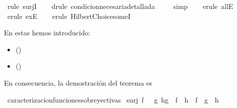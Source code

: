 \begin{isabellebody}
\isamarkupfalse%
\ {\isacharparenleft}rule\ surjI{\isacharparenright}\isanewline
\ \ \isamarkupfalse%
\ {\isacharparenleft}drule\ condicion{\isacharunderscore}necesaria{\isacharunderscore}detallada{\isacharparenright}\isanewline
\ \ \ \isamarkupfalse%
\ simp\isanewline
\ \ \isamarkupfalse%
\ {\isacharparenleft}erule\ allE{\isacharparenright}\isanewline
\ \ \isamarkupfalse%
\ {\isacharparenleft}erule\ exE{\isacharparenright}{\isacharplus}\isanewline
\ \ \isamarkupfalse%
\ {\isacharparenleft}erule\ Hilbert{\isacharunderscore}Choice{\isachardot}someI{\isacharparenright}\isanewline
\ \ \isamarkupfalse%
%
\endisatagproof
{\isafoldproof}%
%
\isadelimproof
%
\endisadelimproof
%
\begin{isamarkuptext}%
En estas hemos introducido:
 \begin{itemize}
    \item[]  
      \hfill ()
     \item[]  
      \hfill ()
\end{itemize}%
\end{isamarkuptext}\isamarkuptrue%
%
\isadelimdocument
%
\endisadelimdocument
%
\isatagdocument
%
\isamarkuptrue%
%
\endisatagdocument
{\isafolddocument}%
%
\isadelimdocument
%
\endisadelimdocument
%
\begin{isamarkuptext}%
En consecuencia, la demostración del teorema es%
\end{isamarkuptext}\isamarkuptrue%
\isamarkupfalse%
\ caracterizacion{\isacharunderscore}funciones{\isacharunderscore}sobreyectivas{\isacharcolon}\isanewline
\ {\isachardoublequoteopen}surj\ f\ {\isasymlongleftrightarrow}\ \ {\isacharparenleft}{\isasymforall}g\ h{\isachardot}{\isacharparenleft}g\ {\isasymcirc}\ f\ {\isacharequal}\ h\ {\isasymcirc}\ f{\isacharparenright}\ {\isasymlongrightarrow}\ {\isacharparenleft}g\ {\isacharequal}\ h{\isacharparenright}{\isacharparenright}{\isachardoublequoteclose}\isanewline
%
\isadelimproof
\ \ %
\endisadelimproof
%
\isatagproof
{}\isamarkupfalse%
\isanewline
\ \ \isanewline
%
\endisatagproof
{\isafoldproof}%
%
\isadelimproof
%
\endisadelimproof
%
\isadelimtheory
%
\endisadelimtheory
%
\isatagtheory
%
\endisatagtheory
{\isafoldtheory}%
%
\isadelimtheory
%
\endisadelimtheory
%
\end{isabellebody}%
